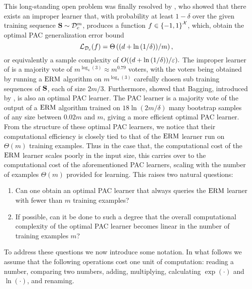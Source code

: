 This long-standing open problem was finally resolved by \cite{hannekeoptimal}, who showed that there exists an improper learner that, with probability at least $ 1-\delta $ over the given training sequence $ \mathbf{S}\sim \mathcal{D}_{c}^{m} $,  produces a function $ f\in \left\{ -1,1 \right\}^{\mathcal{X}} $, which, obtain the optimal PAC generalization error bound 
$$ \operatorname{\mathcal{L}}_{\mathcal{D}_{c}}(f) =\Theta\left((d+\ln{\left(1/\delta \right)})/m \right),$$
or equivalently a sample complexity of $O( (d+\ln{\left(1/\delta \right)})/\varepsilon).$   
 The improper learner of \cite{hannekeoptimal} is a  majority vote of $ m^{\log_{4}(3)} \approx m^{0.79}$ voters, with the voters being obtained by running a $ \mathrm{ERM} $ algorithm on $m^{\log_{4}(3)}$ carefully chosen sub training sequences of $ \mathbf{S} $, each of size $ 2m/3 $. Furthermore, \cite{baggingoptimalPAClearner} showed that Bagging, introduced by \cite{Breiman1996BaggingP}, is also an optimal PAC learner. The PAC learner is a majority vote of the output of a $ \mathrm{ERM} $ algorithm trained on $ 18\ln{\left(2m/\delta \right)} $ many bootstrap samples of any size between $ 0.02m $ and $ m $, giving a more efficient optimal PAC learner. From the structure of these optimal PAC learners, we notice that their computational efficiency is closely tied to that of the $\mathrm{ERM}$ learner run on $ \Theta(m) $ training examples. Thus in the case that, the computational cost of the $\mathrm{ERM}$ learner scales poorly in the input size, this carries over to the computational cost of the aforementioned PAC learners, scaling with the number of examples $\Theta(m)$ provided for learning. This raises two natural questions: 
\vspace{-0.075cm}
\begin{enumerate}
    \item Can one obtain an optimal PAC learner that always queries the $ \mathrm{ERM} $ learner with fewer than $ m $  training examples?\label{question1}
    \item\vspace{-0.2cm} If possible, can it be done to such a degree that the overall computational complexity of the optimal PAC learner becomes linear in the number of training examples $ m $?\label{question2}
\end{enumerate}
\vspace{-0.075cm}

To address these questions we now introduce some notation. In what follows we assume that the following operations cost one unit of computation: reading a number, comparing two numbers, adding, multiplying, calculating $\exp(\cdot)$ and $\ln{\left(\cdot \right)}$, and renaming. 

